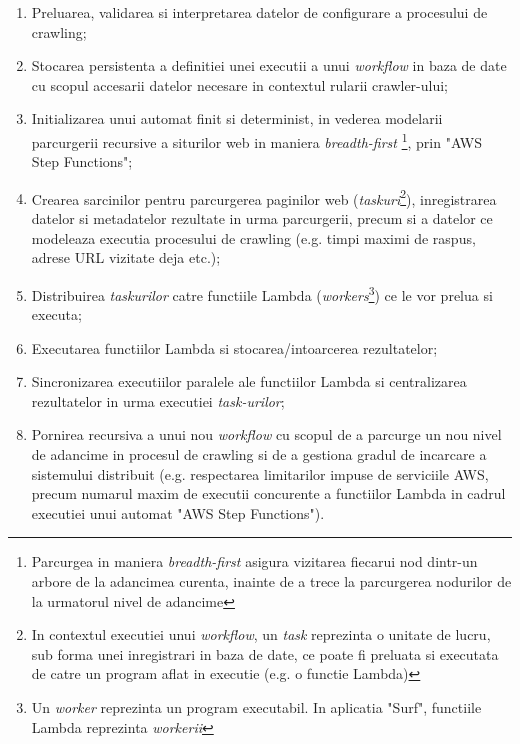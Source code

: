 \begin{enumerate}

	\item{Preluarea, validarea si interpretarea datelor de configurare a procesului de crawling;}
	
	\item{Stocarea persistenta a definitiei unei executii a unui \textit{workflow} in baza de date cu scopul accesarii datelor necesare in contextul rularii crawler-ului;}
	
	\item{Initializarea unui automat finit si determinist, in vederea modelarii parcurgerii recursive a siturilor web in maniera \textit{breadth-first} \footnote{Parcurgea in maniera \textit{breadth-first} asigura vizitarea fiecarui nod dintr-un arbore de la adancimea curenta, inainte de a trece la parcurgerea nodurilor de la urmatorul nivel de adancime}, prin "AWS Step Functions";}
	
	\item{Crearea sarcinilor pentru parcurgerea paginilor web (\textit{taskuri}\footnote{In contextul executiei unui \textit{workflow}, un \textit{task} reprezinta o unitate de lucru, sub forma unei inregistrari in baza de date, ce poate fi preluata si executata de catre un program aflat in executie (e.g. o functie Lambda)}), inregistrarea datelor si metadatelor rezultate in urma parcurgerii, precum si a datelor ce modeleaza executia procesului de crawling (e.g. timpi maximi de raspus, adrese URL vizitate deja etc.);}
	
	\item{Distribuirea \textit{taskurilor} catre functiile Lambda (\textit{workers}\footnote{Un \textit{worker} reprezinta un program executabil. In aplicatia "Surf", functiile Lambda reprezinta \textit{workerii}}) ce le vor prelua si executa;}
	
	\item{Executarea functiilor Lambda si stocarea/intoarcerea rezultatelor;}
	
	\item{Sincronizarea executiilor paralele ale functiilor Lambda si centralizarea rezultatelor in urma executiei \textit{task-urilor};}
	
	\item{Pornirea recursiva a unui nou \textit{workflow} cu scopul de a parcurge un nou nivel de adancime in procesul de crawling si de a gestiona gradul de incarcare a sistemului distribuit (e.g. respectarea limitarilor impuse de serviciile AWS, precum numarul maxim de executii concurente a functiilor Lambda in cadrul executiei unui automat "AWS Step Functions").}
	
\end{enumerate} 

